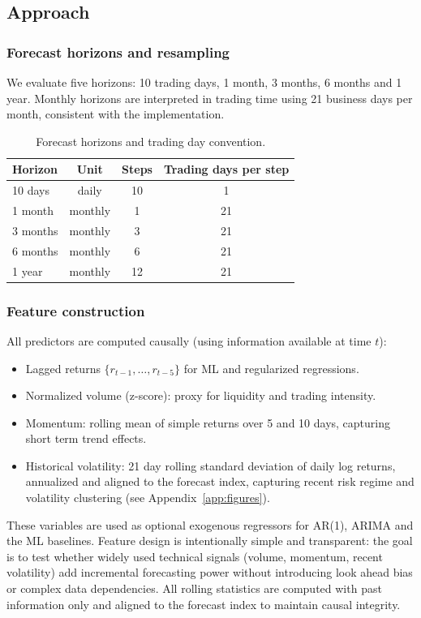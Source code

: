 \documentclass[11pt,a4paper]{article}
\begin{document}
\subsection{Approach}
\label{subsec:approach}

\subsubsection{Forecast horizons and resampling}
We evaluate five horizons: 10 trading days, 1 month, 3 months, 6 months and 1 year. Monthly horizons are interpreted in trading time using 21 business days per month, consistent with the implementation.

\begin{table}[H]
\centering
\caption{Forecast horizons and trading day convention.}
\label{tab:horizons}
\begin{tabular}{l c c c}
\toprule
Horizon & Unit & Steps & Trading days per step \\
\midrule
10 days & daily & 10 & 1 \\
1 month & monthly & 1 & 21 \\
3 months & monthly & 3 & 21 \\
6 months & monthly & 6 & 21 \\
1 year & monthly & 12 & 21 \\
\bottomrule
\end{tabular}
\end{table}

\subsubsection{Feature construction}
All predictors are computed causally (using information available at time $t$):
\begin{itemize}[itemsep=0.55\baselineskip, topsep=0.25\baselineskip]
    \item Lagged returns $\{r_{t-1},\dots,r_{t-5}\}$ for ML and regularized regressions.
    \item Normalized volume (z-score): proxy for liquidity and trading intensity.
    \item Momentum: rolling mean of simple returns over 5 and 10 days, capturing short term trend effects.
    \item Historical volatility: 21 day rolling standard deviation of daily log returns, annualized and aligned to the forecast index, capturing recent risk regime and volatility clustering (see Appendix~\ref{app:figures}).
\end{itemize}
These variables are used as optional exogenous regressors for AR(1), ARIMA and the ML baselines. Feature design is intentionally simple and transparent: the goal is to test whether widely used technical signals (volume, momentum, recent volatility) add incremental forecasting power without introducing look ahead bias or complex data dependencies. All rolling statistics are computed with past information only and aligned to the forecast index to maintain causal integrity.
\end{document}
